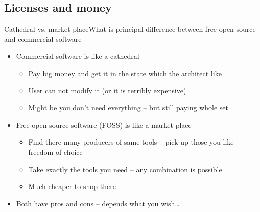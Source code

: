 \documentclass[compress, ucs, xelatex, 11pt, xcolor=svgnames,
  hyperref={
    bookmarks=true,
    unicode=true,
    colorlinks=true,
    pdftitle={Linux, command line and MetaCentrum},
    plainpages=false,
    pdfauthor={Vojtech Zeisek},
    pdfsubject={Course about use of Linux command line, writing shell scripts and using MetaCentrum of CESNET},
    pdfcreator={XeLaTeX},
    pdfkeywords={Linux, GNU, BASH, shell, command line, MetaCentrum},
    linkcolor=DarkRed,
    anchorcolor=DarkBlue,
    citecolor=Indigo,
    filecolor=NavyBlue,
    menucolor=DarkMagenta,
    urlcolor=DarkBlue,
    pdftex},
  url={hyphens, lowtilde} %
  ]{beamer}
\begin{document}
\subsection{Licenses and money}

\begin{frame}{Cathedral vs. market place}{What is principal difference between free open-source and commercial software}
  \begin{itemize}
    \item Commercial software is like a cathedral
    \begin{itemize}
      \item Pay big money and get it in the state which the architect like
      \item User can not modify it (or it is terribly expensive)
      \item Might be you don't need everything -- but still paying whole set
    \end{itemize}
    \item Free open-source software (FOSS) is like a market place
    \begin{itemize}
      \item Find there many producers of same tools -- pick up those you like -- freedom of choice
      \item Take exactly the tools you need -- any combination is possible
      \item Much cheaper to shop there
    \end{itemize}
    \item Both have pros and cons -- depends what you wish\ldots
  \end{itemize}
\end{frame}
\end{document}
